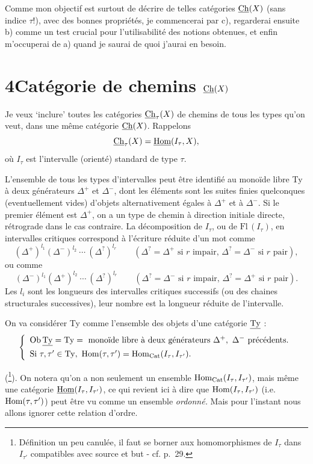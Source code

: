 Comme mon objectif est surtout de décrire de telles catégories $\underline{\mathrm{Ch}}(X)$ (sans indice $\tau$!), avec des bonnes propriétés, je commencerai par c), regarderai ensuite b) comme un test crucial pour l'utilisabilité des notions obtenues, et enfin m'occuperai de a) quand je saurai de quoi j'aurai en besoin.


\section*{4\quad Catégorie de chemins $\underline{\mathrm{Ch}}(X)$}

Je veux ‘inclure’ toutes les catégories $\underline{\mathrm{Ch}}_\tau(X)$ de chemins de tous les types qu'on veut, dans une même catégorie $\underline{\mathrm{Ch}}(X)$. Rappelons
\[
\underline{\mathrm{Ch}}_\tau(X)=\underline{\mathrm{Hom}}(I_\tau,X),
\]
où $I_\tau$ est l'intervalle (orienté) standard de type $\tau$.

L'ensemble de tous les types d'intervalles
peut être identifié au monoïde libre Ty à deux générateurs $\Delta^+$ et $\Delta^-$, dont les éléments sont les suites finies quelconques (eventuellement vides) d'objets alternativement égales à $\Delta^+$ et à $\Delta^-$. Si le premier élément est $\Delta^+$, on a un type de chemin à direction initiale directe, rétrograde dans le cas contraire. La décomposition de $I_\tau$, ou de $\mathrm{Fl}\,(I_\tau)$, en intervalles critiques correspond à l'écriture réduite d'un mot comme %
\[
(\Delta^+)^{l_1}(\Delta^-)^{l_2}\ \cdots\ (\Delta^?)^{l_r} \qquad (\Delta^?=\Delta^+ \text{ si } r \text{ impair, } \Delta^?=\Delta^- \text{ si } r \text{ pair}),
\]
ou comme
\[
(\Delta^-)^{l_1}(\Delta^+)^{l_2}\ \cdots\ (\Delta^?)^{l_r} \qquad (\Delta^?=\Delta^- \text{ si } r \text{ impair, } \Delta^?=\Delta^+ \text{ si } r \text{ pair}).
\]
Les $l_i$ sont les longueurs des intervalles critiques successifs (ou des chaines structurales successives), leur nombre est la longueur réduite de l'intervalle.

On va considérer Ty comme l'ensemble des objets d'une catégorie $\underline{\mathrm{Ty}}$ :
\[
\left\{
\begin{array}{l}
\mathrm{Ob}\,\uTy=\Ty=\ \text{monoïde libre à deux générateurs } \Delta^+,\ \Delta^- \text{ précédents.}\\[1ex]
\text{Si } \tau,\tau'\in\Ty,\ \Hom(\tau,\tau')=\Hom_{\Cat}(I_\tau,I_{\tau'}).
\end{array}
\right.
\]

(\footnote[7]{Définition un peu canulée, il faut se borner aux homomorphismes de $I_\tau$ dans $I_{\tau'}$ compatibles avec source et but - cf. p.~29.}). On notera qu'on a non seulement un ensemble $\mathrm{Hom}_{\mathrm{Cat}}(I_\tau,I_{\tau'})$, mais même une catégorie $\underline{\mathrm{Hom}}(I_\tau,I_{\tau'})$, ce qui revient ici à dire que $\mathrm{Hom}(I_\tau,I_{\tau'})$ (i.e. $\mathrm{Hom}(\tau,\tau')$) peut être vu comme un ensemble \textit{ordonné.} Mais pour l'instant nous allons ignorer cette relation d'ordre.

